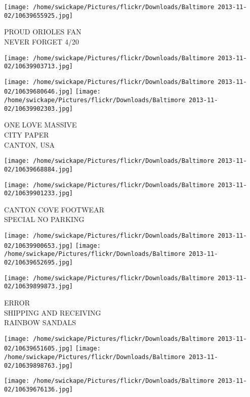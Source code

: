 \documentclass[10pt,letterpaper]{article}
\begin{document}
\vspace{0.25in}
\texttt{[image: /home/swickape/Pictures/flickr/Downloads/Baltimore 2013-11-02/10639655925.jpg]}

PROUD ORIOLES FAN\\
NEVER FORGET 4/20
\pagebreak

\texttt{[image: /home/swickape/Pictures/flickr/Downloads/Baltimore 2013-11-02/10639903713.jpg]}

\vspace{0.25in}
\texttt{[image: /home/swickape/Pictures/flickr/Downloads/Baltimore 2013-11-02/10639680646.jpg]}
\texttt{[image: /home/swickape/Pictures/flickr/Downloads/Baltimore 2013-11-02/10639902303.jpg]}

ONE LOVE MASSIVE\\
CITY PAPER\\
CANTON, USA
\pagebreak

\texttt{[image: /home/swickape/Pictures/flickr/Downloads/Baltimore 2013-11-02/10639668884.jpg]}

\vspace{0.25in}
\texttt{[image: /home/swickape/Pictures/flickr/Downloads/Baltimore 2013-11-02/10639901233.jpg]}

CANTON COVE FOOTWEAR\\
SPECIAL NO PARKING
\pagebreak

\texttt{[image: /home/swickape/Pictures/flickr/Downloads/Baltimore 2013-11-02/10639900653.jpg]}
\texttt{[image: /home/swickape/Pictures/flickr/Downloads/Baltimore 2013-11-02/10639652695.jpg]}

\vspace{0.25in}
\texttt{[image: /home/swickape/Pictures/flickr/Downloads/Baltimore 2013-11-02/10639899873.jpg]}

ERROR\\
SHIPPING AND RECEIVING\\
RAINBOW SANDALS
\pagebreak

\texttt{[image: /home/swickape/Pictures/flickr/Downloads/Baltimore 2013-11-02/10639651605.jpg]}
\texttt{[image: /home/swickape/Pictures/flickr/Downloads/Baltimore 2013-11-02/10639898763.jpg]}

\vspace{0.25in}
\texttt{[image: /home/swickape/Pictures/flickr/Downloads/Baltimore 2013-11-02/10639676136.jpg]}
\end{document}
